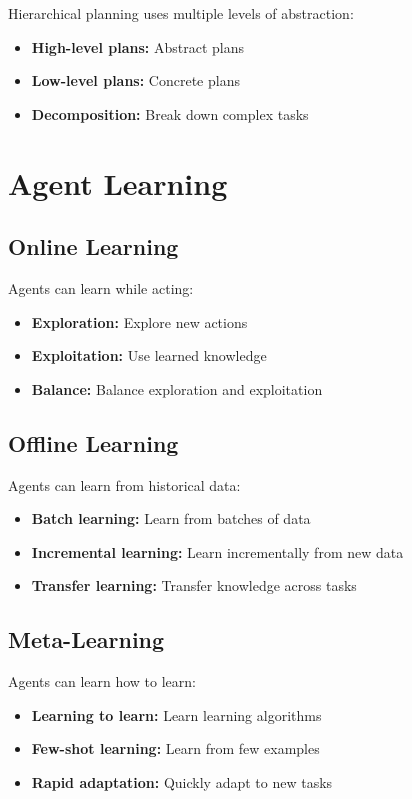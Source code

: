 Hierarchical planning uses multiple levels of abstraction:
\begin{itemize}
    \item \textbf{High-level plans:} Abstract plans
    \item \textbf{Low-level plans:} Concrete plans
    \item \textbf{Decomposition:} Break down complex tasks
\end{itemize}

\section{Agent Learning}

\subsection{Online Learning}

Agents can learn while acting:
\begin{itemize}
    \item \textbf{Exploration:} Explore new actions
    \item \textbf{Exploitation:} Use learned knowledge
    \item \textbf{Balance:} Balance exploration and exploitation
\end{itemize}

\subsection{Offline Learning}

Agents can learn from historical data:
\begin{itemize}
    \item \textbf{Batch learning:} Learn from batches of data
    \item \textbf{Incremental learning:} Learn incrementally from new data
    \item \textbf{Transfer learning:} Transfer knowledge across tasks
\end{itemize}

\subsection{Meta-Learning}

Agents can learn how to learn:
\begin{itemize}
    \item \textbf{Learning to learn:} Learn learning algorithms
    \item \textbf{Few-shot learning:} Learn from few examples
    \item \textbf{Rapid adaptation:} Quickly adapt to new tasks
\end{itemize}


